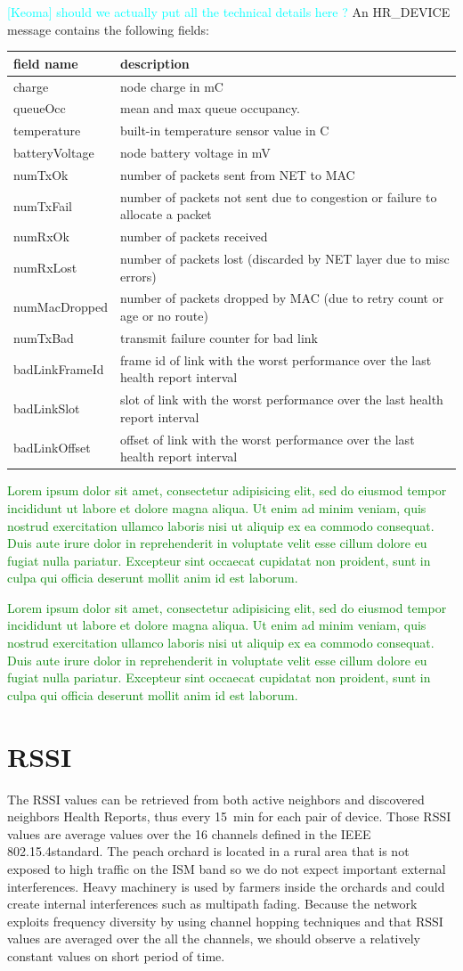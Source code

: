 \documentclass{sig-alternate}
\newcommand{\lorem}               {\textcolor{green}{Lorem ipsum dolor sit amet, consectetur adipisicing elit, sed do eiusmod tempor incididunt ut labore et dolore magna aliqua. Ut enim ad minim veniam, quis nostrud exercitation ullamco laboris nisi ut aliquip ex ea commodo consequat. Duis aute irure dolor in reprehenderit in voluptate velit esse cillum dolore eu fugiat nulla pariatur. Excepteur sint occaecat cupidatat non proident, sunt in culpa qui officia deserunt mollit anim id est laborum.}}
\newcommand{\keoma}[1]              {\textcolor{cyan}{[Keoma] #1}}
\begin{document}
\keoma{should we actually put all the technical details here ?}
An HR\_DEVICE message contains the following fields:
\begin{tabular}{l|p{6cm}}
    field name      & description\\
    \hline
    charge          & node charge in mC\\
    queueOcc        & mean and max queue occupancy.\\
    temperature     & built-in temperature sensor value in C\\
    batteryVoltage  & node battery voltage in mV\\
    numTxOk         & number of packets sent from NET to MAC\\
    numTxFail       & number of packets not sent due to congestion or failure to allocate a packet\\
    numRxOk         & number of packets received\\
    numRxLost       & number of packets lost (discarded by NET layer due to misc errors)\\
    numMacDropped   & number of packets dropped by MAC (due to retry count or age or no route)\\
    numTxBad        & transmit failure counter for bad link\\
    badLinkFrameId  & frame id of link with the worst performance over the last health report interval\\
    badLinkSlot     & slot of link with the worst performance over the last health report interval\\
    badLinkOffset   & offset of link with the worst performance over the last health report interval\\
\end{tabular}


\lorem


\lorem

\section{RSSI}
\label{sec:rssi}


The RSSI values can be retrieved from both active neighbors and discovered neighbors Health Reports, thus every 15~min for each pair of device.
Those RSSI values are average values over the 16 channels defined in the IEEE 802.15.4standard.
The peach orchard is located in a rural area that is not exposed to high traffic on the ISM band so we do not expect important external interferences.
Heavy machinery is used by farmers inside the orchards and could create internal interferences such as multipath fading.
Because the network exploits frequency diversity by using channel hopping techniques and that RSSI values are averaged over the all the channels, we should observe a relatively constant values on short period of time.
\end{document}
